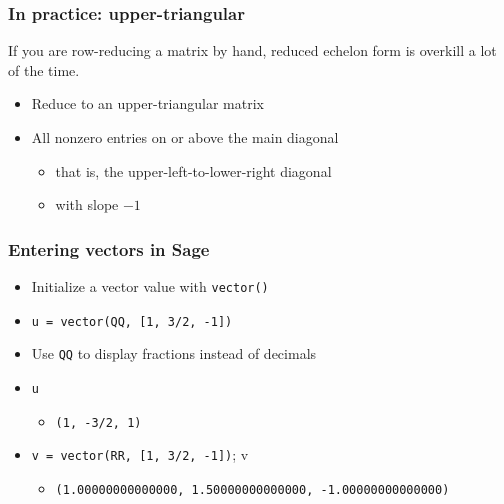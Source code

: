 \documentclass[11pt,ignorenonframetext,]{beamer}
\begin{document}
\begin{frame}\frametitle{In practice: upper-triangular}

If you are row-reducing a matrix by hand, reduced echelon form is
overkill a lot of the time.

\begin{itemize}
\itemsep1pt\parskip0pt
\item
  Reduce to an upper-triangular matrix
\item
  All nonzero entries on or above the main diagonal

  \begin{itemize}
  \itemsep1pt\parskip0pt
  \item
    that is, the upper-left-to-lower-right diagonal
  \item
    with slope $-1$
  \end{itemize}
\end{itemize}

\end{frame}

\begin{frame}\frametitle{Entering vectors in Sage}

\begin{itemize}
\itemsep1pt\parskip0pt
\item
  Initialize a vector value with \texttt{vector()}
\item
  \texttt{u = vector(QQ, [1, 3/2, -1])}
\item
  Use \texttt{QQ} to display fractions instead of decimals
\item
  \texttt{u}

  \begin{itemize}
  \itemsep1pt\parskip0pt
  \item
    \texttt{(1, -3/2, 1)}
  \end{itemize}
\item
  \texttt{v = vector(RR, [1, 3/2, -1])}; v

  \begin{itemize}
  \itemsep1pt\parskip0pt
  \item
    \texttt{(1.00000000000000, 1.50000000000000, -1.00000000000000)}
  \end{itemize}
\end{itemize}

\end{frame}
\end{document}
